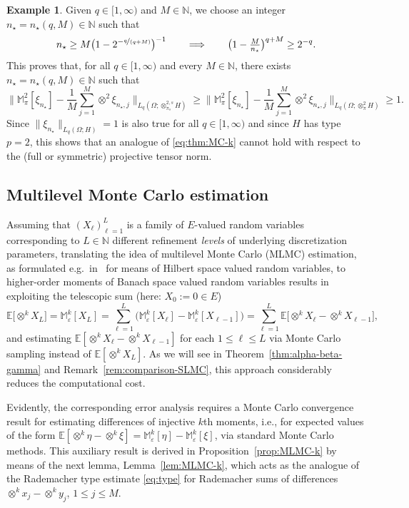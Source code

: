 \documentclass[reqno]{amsart}
\numberwithin{equation}{section}
\newcommand{\bbE}{\mathbb{E}}
\newcommand{\bbM}{\mathbb{M}}
\newcommand{\bbN}{\mathbb{N}}
\newcommand{\xk}{\otimes^k}
\newcommand{\Mk}{\bbM^k_\varepsilon}
\newcommand{\norm}[2]{     \| #1       \|_{ #2 }}
\theoremstyle{remark}
\theoremstyle{definition}
\newtheorem{example}[lemma]{Example}
\begin{document}
\begin{example}
	Given $q\in[1,\infty)$ and 
	$M\in\bbN$, we choose an integer 
	$n_\star = n_\star(q,M)\in \bbN$ 
	such that 
	\[
	n_\star 
	\geq 
	M \bigl( 1 - 2^{-\nicefrac{q}{(q+M)}}  \bigr)^{-1} 
	\qquad 
	\Longrightarrow 
	\qquad 
	\bigl( 1 - \tfrac{M}{n_\star} \bigr)^{q+M}  
	\geq 2^{-q} . 
	\]
	This proves that, 
	for all $q\in[1,\infty)$ and 
	every $M\in\bbN$, there exists 
	${n_\star=n_\star(q,M)\in\bbN}$ 
	such that 
	\[
	\biggl\| 
	\bbM^2_\pi [ \xi_{n_\star} ] 
	-
	\frac{1}{M} 
	\sum_{j=1}^M 
	\otimes^2 \xi_{n_\star,j} 
	\biggr\|_{L_q(\Omega; \otimes_{\pi_s}^{2,s} H)} 
	\geq 
	\biggl\| 
	\bbM^2_\pi [ \xi_{n_\star} ] 
	-
	\frac{1}{M} 
	\sum_{j=1}^M 
	\otimes^2 \xi_{n_\star,j} 
	\biggr\|_{L_q(\Omega; \otimes_\pi^2 H)} 
	\geq 1 . 
	\]
	Since $\norm{\xi_{n_\star}}{L_q(\Omega;H)} = 1$ 
	is also true 
	for all $q\in[1,\infty)$ and 
	since $H$ has type $p=2$, 
	this shows that an analogue 
	of \eqref{eq:thm:MC-k} cannot hold with respect to 
	the (full or symmetric) 
	projective tensor norm. 
\end{example} 


\subsection{Multilevel Monte Carlo estimation} 
\label{subsec:mlmc} 

Assuming that $(X_\ell)_{\ell=1}^L$ is 
a family of $E$-valued random variables 
corresponding to $L\in\bbN$ 
different refinement \emph{levels}  
of underlying discretization parameters, 
translating the idea of multilevel Monte Carlo (MLMC)
estimation, as formulated 
e.g.\ in~\cite[p.~5]{CliffeGilesScheichlTeckentrup2011} 
for means of 
Hilbert space valued random variables, 
to higher-order moments of Banach space 
valued random variables 
results in exploiting the telescopic sum 
(here: $X_0:=0\in E$)
% 
\[
\bbE\bigl[ {\xk} X_L \bigr]
= 
\Mk[X_L] 
= 
\sum_{\ell=1}^L 
\bigl( \Mk[X_\ell] - \Mk[X_{\ell-1}] \bigr) 
= 
\sum_{\ell=1}^L 
\bbE\bigl[ {\xk} X_{\ell} - {\xk} X_{\ell-1} \bigr], 
\]
%
and estimating $\bbE[ {\xk} X_{\ell} - {\xk} X_{\ell-1} ]$ 
for each $1\leq\ell\leq L$ 
via Monte Carlo sampling
instead of $\bbE[ {\xk} X_L ]$. 
As we will see in Theorem~\ref{thm:alpha-beta-gamma} 
and Remark~\ref{rem:comparison-SLMC}, 
this approach considerably reduces the computational cost. 

Evidently, the corresponding error analysis 
requires a Monte Carlo convergence result for 
estimating differences of injective $k$th moments, i.e., 
for expected values of the form 
$\bbE[{\xk}\eta - {\xk}\xi] = \Mk[\eta] - \Mk[\xi]$, 
via standard Monte Carlo methods. 
This auxiliary result is derived in Proposition~\ref{prop:MLMC-k} 
by means of the next lemma, Lemma~\ref{lem:MLMC-k}, 
which acts as the analogue of the Rademacher 
type estimate \eqref{eq:type} for Rademacher sums 
of differences 
${\xk} x_j - {\xk} y_j$, $1\leq j\leq M$. 
\end{document}
